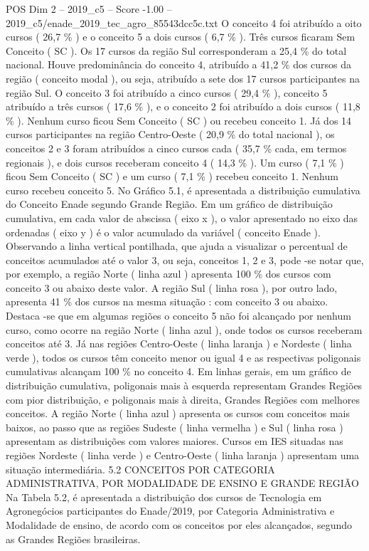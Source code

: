 \begin{textsample}{POS Dim 2 – 2019\_c5 – Score -1.00 – 2019\_c5/enade\_2019\_tec\_agro\_85543dcc5c.txt}
O conceito 4 foi atribuído a oito cursos ( 26,7 \% ) e o conceito 5 a dois cursos ( 6,7 \% ).
Três cursos ficaram Sem Conceito ( SC ).
Os 17 cursos da região Sul corresponderam a 25,4 \% do total nacional.
Houve predominância do conceito 4, atribuído a 41,2 \% dos cursos da região ( conceito modal ), ou seja, atribuído a sete dos 17 cursos participantes na região Sul.
O conceito 3 foi atribuído a cinco cursos ( 29,4 \% ), conceito 5 atribuído a três cursos ( 17,6 \% ), e o conceito 2 foi atribuído a dois cursos ( 11,8 \% ).
Nenhum curso ficou Sem Conceito ( SC ) ou recebeu conceito 1.
Já dos 14 cursos participantes na região Centro-Oeste ( 20,9 \% do total nacional ), os conceitos 2 e 3 foram atribuídos a cinco cursos cada ( 35,7 \% cada, em termos regionais ), e dois cursos receberam conceito 4 ( 14,3 \% ).
Um curso ( 7,1 \% ) ficou Sem Conceito ( SC ) e um curso ( 7,1 \% ) recebeu conceito 1.
Nenhum curso recebeu conceito 5.
No Gráfico 5.1, é apresentada a distribuição cumulativa do Conceito Enade segundo Grande Região.
Em um gráfico de distribuição cumulativa, em cada valor de abscissa ( eixo x ), o valor apresentado no eixo das ordenadas ( eixo y ) é o valor acumulado da variável ( conceito Enade ).
Observando a linha vertical pontilhada, que ajuda a visualizar o percentual de conceitos acumulados até o valor 3, ou seja, conceitos 1, 2 e 3, pode -se notar que, por exemplo, a região Norte ( linha azul ) apresenta 100 \% dos cursos com conceito 3 ou abaixo deste valor.
A região Sul ( linha rosa ), por outro lado, apresenta 41 \% dos cursos na mesma situação : com conceito 3 ou abaixo.
Destaca -se que em algumas regiões o conceito 5 não foi alcançado por nenhum curso, como ocorre na região Norte ( linha azul ), onde todos os cursos receberam conceitos até 3.
Já nas regiões Centro-Oeste ( linha laranja ) e Nordeste ( linha verde ), todos os cursos têm conceito menor ou igual 4 e as respectivas poligonais cumulativas alcançam 100 \% no conceito 4.
Em linhas gerais, em um gráfico de distribuição cumulativa, poligonais mais à esquerda representam Grandes Regiões com pior distribuição, e poligonais mais à direita, Grandes Regiões com melhores conceitos.
A região Norte ( linha azul ) apresenta os cursos com conceitos mais baixos, ao passo que as regiões Sudeste ( linha vermelha ) e Sul ( linha rosa ) apresentam as distribuições com valores maiores.
Cursos em IES situadas nas regiões Nordeste ( linha verde ) e Centro-Oeste ( linha laranja ) apresentam uma situação intermediária. 5.2 CONCEITOS POR CATEGORIA ADMINISTRATIVA, POR MODALIDADE DE ENSINO E GRANDE REGIÃO Na Tabela 5.2, é apresentada a distribuição dos cursos de Tecnologia em Agronegócios participantes do Enade/2019, por Categoria Administrativa e Modalidade de ensino, de acordo com os conceitos por eles alcançados, segundo as Grandes Regiões brasileiras.

\end{textsample}
